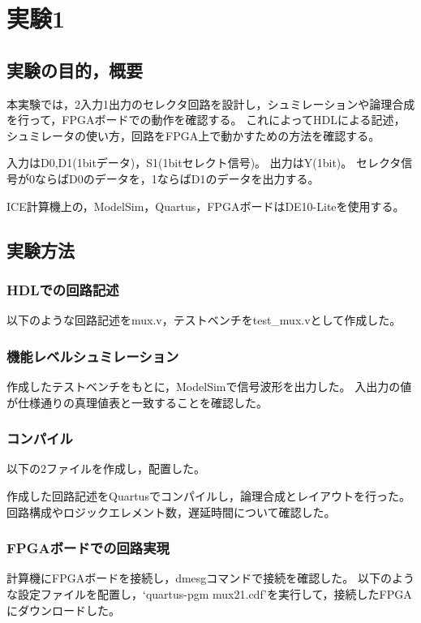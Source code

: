 
\section{実験1}
\subsection{実験の目的，概要}
本実験では，2入力1出力のセレクタ回路を設計し，シュミレーションや論理合成を行って，FPGAボードでの動作を確認する。
これによってHDLによる記述，シュミレータの使い方，回路をFPGA上で動かすための方法を確認する。

入力はD0,D1(1bitデータ)，S1(1bitセレクト信号)。
出力はY(1bit)。
セレクタ信号が0ならばD0のデータを，1ならばD1のデータを出力する。

ICE計算機上の，ModelSim，Quartus，FPGAボードはDE10-Liteを使用する。

\subsection{実験方法}
\subsubsection{HDLでの回路記述}
以下のような回路記述をmux.v，テストベンチをtest\_mux.vとして作成した。



\subsubsection{機能レベルシュミレーション}
作成したテストベンチをもとに，ModelSimで信号波形を出力した。
入出力の値が仕様通りの真理値表と一致することを確認した。

\subsubsection{コンパイル}
以下の2ファイルを作成し，配置した。



作成した回路記述をQuartusでコンパイルし，論理合成とレイアウトを行った。
回路構成やロジックエレメント数，遅延時間について確認した。

\subsubsection{FPGAボードでの回路実現}
計算機にFPGAボードを接続し，dmesgコマンドで接続を確認した。
以下のような設定ファイルを配置し，`quartus-pgm mux21.cdf'を実行して，接続したFPGAにダウンロードした。


